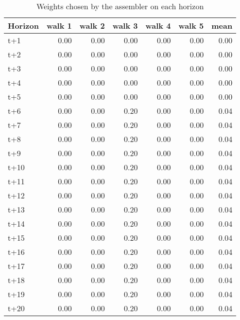 \begin{table}[H]
\centering
\caption{Weights chosen by the assembler on each horizon}
\label{tab:weights_assembler}
\begin{tabular}{lrrrrrr}
\toprule
Horizon &  walk 1 &  walk 2 &  walk 3 &  walk 4 &  walk 5 &  mean \\
\midrule
t+1  &    0.00 &    0.00 &    0.00 &    0.00 &    0.00 &  0.00 \\
t+2  &    0.00 &    0.00 &    0.00 &    0.00 &    0.00 &  0.00 \\
t+3  &    0.00 &    0.00 &    0.00 &    0.00 &    0.00 &  0.00 \\
t+4  &    0.00 &    0.00 &    0.00 &    0.00 &    0.00 &  0.00 \\
t+5  &    0.00 &    0.00 &    0.00 &    0.00 &    0.00 &  0.00 \\
t+6  &    0.00 &    0.00 &    0.20 &    0.00 &    0.00 &  0.04 \\
t+7  &    0.00 &    0.00 &    0.20 &    0.00 &    0.00 &  0.04 \\
t+8  &    0.00 &    0.00 &    0.20 &    0.00 &    0.00 &  0.04 \\
t+9  &    0.00 &    0.00 &    0.20 &    0.00 &    0.00 &  0.04 \\
t+10 &    0.00 &    0.00 &    0.20 &    0.00 &    0.00 &  0.04 \\
t+11 &    0.00 &    0.00 &    0.20 &    0.00 &    0.00 &  0.04 \\
t+12 &    0.00 &    0.00 &    0.20 &    0.00 &    0.00 &  0.04 \\
t+13 &    0.00 &    0.00 &    0.20 &    0.00 &    0.00 &  0.04 \\
t+14 &    0.00 &    0.00 &    0.20 &    0.00 &    0.00 &  0.04 \\
t+15 &    0.00 &    0.00 &    0.20 &    0.00 &    0.00 &  0.04 \\
t+16 &    0.00 &    0.00 &    0.20 &    0.00 &    0.00 &  0.04 \\
t+17 &    0.00 &    0.00 &    0.20 &    0.00 &    0.00 &  0.04 \\
t+18 &    0.00 &    0.00 &    0.20 &    0.00 &    0.00 &  0.04 \\
t+19 &    0.00 &    0.00 &    0.20 &    0.00 &    0.00 &  0.04 \\
t+20 &    0.00 &    0.00 &    0.20 &    0.00 &    0.00 &  0.04 \\
\bottomrule
\end{tabular}
\end{table}
